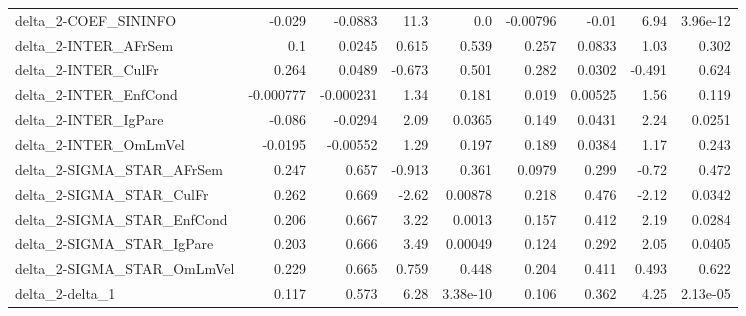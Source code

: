 \begin{tabular}{lrrrrrrrr}
delta\_2-COEF\_SININFO                  &      -0.029 &      -0.0883 &    11.3 &      0.0 &   -0.00796 &       -0.01 &         6.94 &      3.96e-12 \\
delta\_2-INTER\_AFrSem                  &         0.1 &       0.0245 &   0.615 &    0.539 &      0.257 &      0.0833 &         1.03 &         0.302 \\
delta\_2-INTER\_CulFr                   &       0.264 &       0.0489 &  -0.673 &    0.501 &      0.282 &      0.0302 &       -0.491 &         0.624 \\
delta\_2-INTER\_EnfCond                 &   -0.000777 &    -0.000231 &    1.34 &    0.181 &      0.019 &     0.00525 &         1.56 &         0.119 \\
delta\_2-INTER\_IgPare                  &      -0.086 &      -0.0294 &    2.09 &   0.0365 &      0.149 &      0.0431 &         2.24 &        0.0251 \\
delta\_2-INTER\_OmLmVel                 &     -0.0195 &     -0.00552 &    1.29 &    0.197 &      0.189 &      0.0384 &         1.17 &         0.243 \\
delta\_2-SIGMA\_STAR\_AFrSem             &       0.247 &        0.657 &  -0.913 &    0.361 &     0.0979 &       0.299 &        -0.72 &         0.472 \\
delta\_2-SIGMA\_STAR\_CulFr              &       0.262 &        0.669 &   -2.62 &  0.00878 &      0.218 &       0.476 &        -2.12 &        0.0342 \\
delta\_2-SIGMA\_STAR\_EnfCond            &       0.206 &        0.667 &    3.22 &   0.0013 &      0.157 &       0.412 &         2.19 &        0.0284 \\
delta\_2-SIGMA\_STAR\_IgPare             &       0.203 &        0.666 &    3.49 &  0.00049 &      0.124 &       0.292 &         2.05 &        0.0405 \\
delta\_2-SIGMA\_STAR\_OmLmVel            &       0.229 &        0.665 &   0.759 &    0.448 &      0.204 &       0.411 &        0.493 &         0.622 \\
delta\_2-delta\_1                       &       0.117 &        0.573 &    6.28 & 3.38e-10 &      0.106 &       0.362 &         4.25 &      2.13e-05 \\
\bottomrule
\end{tabular}
